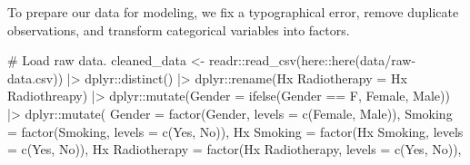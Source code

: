 \documentclass[
  letterpaper,
  DIV=11,
  numbers=noendperiod]{scrartcl}
\newenvironment{Shaded}{\begin{snugshade}}{\end{snugshade}}
\newcommand{\AttributeTok}[1]{\textcolor[rgb]{0.40,0.45,0.13}{#1}}
\newcommand{\CommentTok}[1]{\textcolor[rgb]{0.37,0.37,0.37}{#1}}
\newcommand{\FunctionTok}[1]{\textcolor[rgb]{0.28,0.35,0.67}{#1}}
\newcommand{\NormalTok}[1]{\textcolor[rgb]{0.00,0.23,0.31}{#1}}
\newcommand{\OtherTok}[1]{\textcolor[rgb]{0.00,0.23,0.31}{#1}}
\newcommand{\SpecialCharTok}[1]{\textcolor[rgb]{0.37,0.37,0.37}{#1}}
\newcommand{\StringTok}[1]{\textcolor[rgb]{0.13,0.47,0.30}{#1}}
\begin{document}
To prepare our data for modeling, we fix a typographical error, remove
duplicate observations, and transform categorical variables into
factors.

\begin{Shaded}
\begin{Highlighting}[]
\CommentTok{\#\textquotesingle{} Load raw data.}
\NormalTok{cleaned\_data }\OtherTok{\textless{}{-}} 
\NormalTok{  readr}\SpecialCharTok{::}\FunctionTok{read\_csv}\NormalTok{(here}\SpecialCharTok{::}\FunctionTok{here}\NormalTok{(}\StringTok{\textquotesingle{}data/raw{-}data.csv\textquotesingle{}}\NormalTok{)) }\SpecialCharTok{|\textgreater{}}
\NormalTok{  dplyr}\SpecialCharTok{::}\FunctionTok{distinct}\NormalTok{() }\SpecialCharTok{|\textgreater{}}
\NormalTok{  dplyr}\SpecialCharTok{::}\FunctionTok{rename}\NormalTok{(}\StringTok{\textasciigrave{}}\AttributeTok{Hx Radiotherapy}\StringTok{\textasciigrave{}} \OtherTok{=} \StringTok{\textquotesingle{}Hx Radiothreapy\textquotesingle{}}\NormalTok{) }\SpecialCharTok{|\textgreater{}}
\NormalTok{  dplyr}\SpecialCharTok{::}\FunctionTok{mutate}\NormalTok{(}\AttributeTok{Gender =} \FunctionTok{ifelse}\NormalTok{(Gender }\SpecialCharTok{==} \StringTok{\textquotesingle{}F\textquotesingle{}}\NormalTok{, }\StringTok{\textquotesingle{}Female\textquotesingle{}}\NormalTok{, }\StringTok{\textquotesingle{}Male\textquotesingle{}}\NormalTok{)) }\SpecialCharTok{|\textgreater{}}
\NormalTok{  dplyr}\SpecialCharTok{::}\FunctionTok{mutate}\NormalTok{(}
    \AttributeTok{Gender =} \FunctionTok{factor}\NormalTok{(Gender, }\AttributeTok{levels =} \FunctionTok{c}\NormalTok{(}\StringTok{\textquotesingle{}Female\textquotesingle{}}\NormalTok{, }\StringTok{\textquotesingle{}Male\textquotesingle{}}\NormalTok{)),}
    \AttributeTok{Smoking =} \FunctionTok{factor}\NormalTok{(Smoking, }\AttributeTok{levels =} \FunctionTok{c}\NormalTok{(}\StringTok{\textquotesingle{}Yes\textquotesingle{}}\NormalTok{, }\StringTok{\textquotesingle{}No\textquotesingle{}}\NormalTok{)),}
    \StringTok{\textasciigrave{}}\AttributeTok{Hx Smoking}\StringTok{\textasciigrave{}} \OtherTok{=} \FunctionTok{factor}\NormalTok{(}\StringTok{\textasciigrave{}}\AttributeTok{Hx Smoking}\StringTok{\textasciigrave{}}\NormalTok{, }\AttributeTok{levels =} \FunctionTok{c}\NormalTok{(}\StringTok{\textquotesingle{}Yes\textquotesingle{}}\NormalTok{, }\StringTok{\textquotesingle{}No\textquotesingle{}}\NormalTok{)),}
    \StringTok{\textasciigrave{}}\AttributeTok{Hx Radiotherapy}\StringTok{\textasciigrave{}} \OtherTok{=} \FunctionTok{factor}\NormalTok{(}\StringTok{\textasciigrave{}}\AttributeTok{Hx Radiotherapy}\StringTok{\textasciigrave{}}\NormalTok{, }\AttributeTok{levels =} \FunctionTok{c}\NormalTok{(}\StringTok{\textquotesingle{}Yes\textquotesingle{}}\NormalTok{, }\StringTok{\textquotesingle{}No\textquotesingle{}}\NormalTok{)),}

\end{Highlighting}
\end{Shaded}
\end{document}
